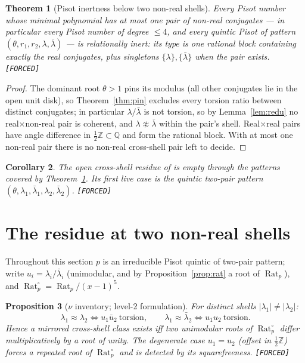 \documentclass[11pt]{article}
\newcommand{\F}{\textnormal{\texttt{[FORCED]}}}
\newcommand{\Q}{\mathbb{Q}}
\newcommand{\Z}{\mathbb{Z}}
\newcommand{\Rat}{\operatorname{Rat}}
\newtheorem{theorem}{Theorem}[section]
\newtheorem{proposition}[theorem]{Proposition}
\newtheorem{corollary}[theorem]{Corollary}
\theoremstyle{definition}
\begin{document}
\begin{theorem}[Pisot inertness below two non-real shells]\label{thm:pisot1pair}
Every Pisot number whose minimal polynomial has at most one pair of non-real
conjugates --- in particular every Pisot number of degree $\le 4$, and every
quintic Pisot of pattern $(\theta,r_1,r_2,\lambda,\bar\lambda)$ --- is
relationally inert: its type is one rational block containing exactly the real
conjugates, plus singletons $\{\lambda\},\{\bar\lambda\}$ when the pair exists. \F
\end{theorem}

\begin{proof}
The dominant root $\theta>1$ pins its modulus (all other conjugates lie in the
open unit disk), so Theorem~\ref{thm:pin} excludes every torsion ratio between
distinct conjugates; in particular $\lambda/\bar\lambda$ is not torsion, so by
Lemma~\ref{lem:redu} no real$\times$non-real pair is coherent, and
$\lambda\not\approx\bar\lambda$ within the pair's shell. Real$\times$real pairs
have angle difference in $\tfrac12\Z\subset\Q$ and form the rational block.
With at most one non-real pair there is no non-real cross-shell pair left to
decide.
\end{proof}

\begin{corollary}\label{cor:residue-location}
The open cross-shell residue of \cite[Cor.~7.16]{relcharge} is empty through
the patterns covered by Theorem~\ref{thm:pisot1pair}. Its first live case is
the quintic two-pair pattern $(\theta,\lambda_1,\bar\lambda_1,\lambda_2,\bar\lambda_2)$. \F
\end{corollary}

\section{The residue at two non-real shells}\label{sec:residue}

Throughout this section $p$ is an irreducible Pisot quintic of two-pair pattern;
write $u_i=\lambda_i/\bar\lambda_i$ (unimodular, and by
Proposition~\ref{prop:rat} a root of $\Rat_p$), and
$\Rat_p^{\circ}=\Rat_p/(x-1)^5$.

\begin{proposition}[$\nu$ inventory; level-2 formulation]\label{prop:nuinv}
For distinct shells $|\lambda_1|\neq|\lambda_2|$:
\[
\lambda_1\approx\lambda_2\iff u_1\bar u_2\ \text{torsion},\qquad
\lambda_1\approx\bar\lambda_2\iff u_1u_2\ \text{torsion}.
\]
Hence a mirrored cross-shell class exists iff two unimodular roots of
$\Rat_p^{\circ}$ differ multiplicatively by a root of unity. The degenerate
case $u_1=u_2$ (offset in $\tfrac12\Z$) forces a repeated root of
$\Rat_p^{\circ}$ and is detected by its squarefreeness. \F
\end{proposition}
\end{document}
